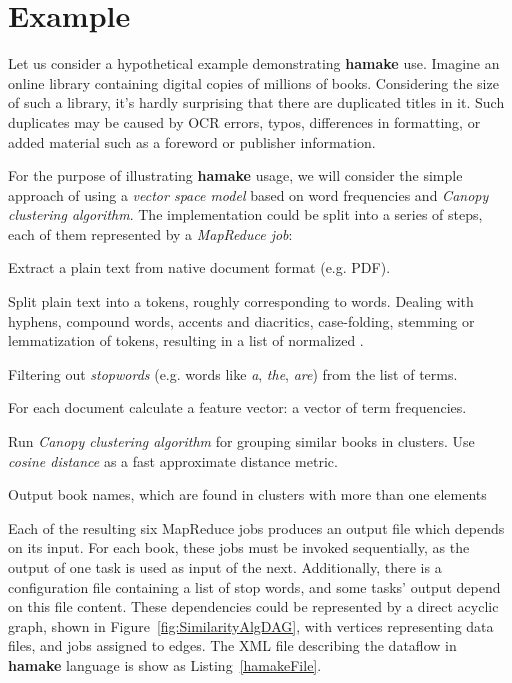 \documentclass[10pt,conference,letterpaper]{IEEEtran}
\begin{document}
\section{Example}

Let us consider a hypothetical example demonstrating \textbf{hamake}
use. Imagine an online library containing digital copies of millions of
books. Considering the size of such a library, it's hardly surprising that
there are duplicated titles in it. Such duplicates may be caused by
OCR errors, typos, differences in formatting, or added material such
as a foreword or publisher information.

For the purpose of illustrating \textbf{hamake} usage, we will
consider the simple approach of using a \textit{vector space
  model}\cite{manning2008introduction} based on word frequencies and
\textit{Canopy clustering algorithm}\cite{efficientClustering}. The
implementation could be split into a series of steps, each of them
represented by a \textit{MapReduce job}:

\begin{description}
\item[\emph{ExtractText}] Extract a plain text from native document format
  (e.g. PDF).
\item[\emph{Tokenize}] Split plain text into a tokens, roughly
  corresponding to words. Dealing with hyphens, compound words,
  accents and diacritics, case-folding, stemming or lemmatization of
  tokens, resulting in a list of normalized .
\item[\emph{FilterStopwords}] Filtering out \textit{stopwords} (e.g. words
  like \textit{a}, \textit{the}, \textit{are}) from the list of
  terms.
\item[\emph{CalculateTF}] For each document calculate a feature
  vector: a vector of term frequencies.
\item[\emph{FindSimilar}] Run \textit{Canopy clustering algorithm}
  for grouping similar books in clusters. Use
  \textit{cosine distance} as a fast approximate distance metric. 
\item[\emph{OutputResult}] Output book names, which are found in
  clusters with more than one elements
\end{description}

Each of the resulting six MapReduce jobs produces an output file which
depends on its input. For each book, these jobs must be invoked
sequentially, as the output of one task is used as input of the next. Additionally, there is a configuration file containing a list of
stop words, and some tasks' output depend on this file content. These
dependencies could be represented by a direct acyclic graph, shown in
Figure~\ref{fig:SimilarityAlgDAG}, with vertices representing data
files, and jobs assigned to edges. The XML file describing the
dataflow in \textbf{hamake} language is show as
Listing~\ref{hamakeFile}.
\end{document}
